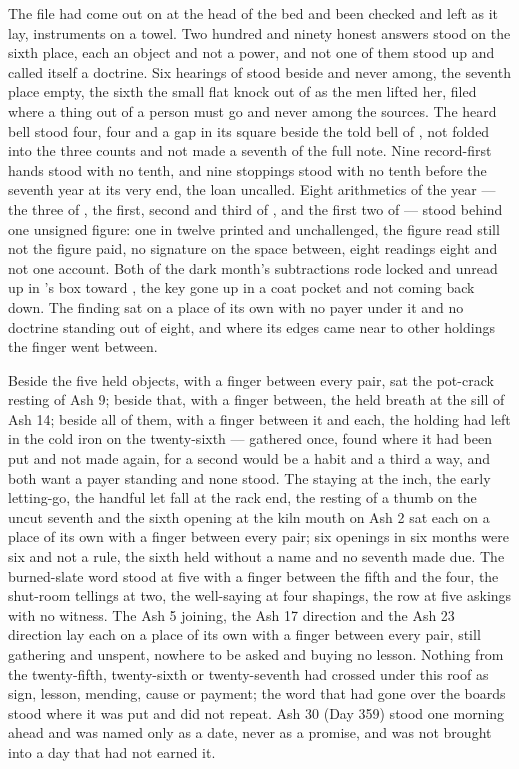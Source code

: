 The file had come out on  at the head of the bed and been checked and left as it lay, instruments on a towel. Two hundred and ninety honest answers stood on the sixth place, each an object and not a power, and not one of them stood up and called itself a doctrine. Six hearings of  stood beside and never among, the seventh place empty, the sixth the small flat knock out of  as the men lifted her, filed where a thing out of a person must go and never among the sources. The heard bell stood four, four and a gap in its square beside the told bell of , not folded into the three counts and not made a seventh of the full note. Nine record-first hands stood with no tenth, and nine stoppings stood with no tenth before the seventh year at its very end, the loan uncalled. Eight arithmetics of the year --- the three of , the first, second and third of , and the first two of  --- stood behind one unsigned figure: one in twelve printed and unchallenged, the figure read still not the figure paid, no signature on the space between, eight readings eight and not one account. Both of the dark month's subtractions rode locked and unread up  in 's box toward , the key gone up in a coat pocket and not coming back down. The finding sat on a place of its own with no payer under it and no doctrine standing out of eight, and where its edges came near to other holdings the finger went between.

Beside the five held objects, with a finger between every pair, sat the pot-crack resting of Ash 9; beside that, with a finger between, the held breath at the sill of Ash 14; beside all of them, with a finger between it and each, the holding  had left in the cold iron on the twenty-sixth --- gathered once, found where it had been put and not made again, for a second would be a habit and a third a way, and both want a payer standing and none stood. The staying at the inch, the early letting-go, the handful let fall at the rack end, the resting of a thumb on the uncut seventh and the sixth opening at the kiln mouth on Ash 2 sat each on a place of its own with a finger between every pair; six openings in six months were six and not a rule, the sixth held without a name and no seventh made due. The burned-slate word stood at five with a finger between the fifth and the four, the shut-room tellings at two, the well-saying at four shapings, the row at five askings with no witness. The Ash 5 joining, the Ash 17 direction and the Ash 23 direction lay each on a place of its own with a finger between every pair, still gathering and unspent, nowhere to be asked and buying no lesson. Nothing from the twenty-fifth, twenty-sixth or twenty-seventh had crossed under this roof as sign, lesson, mending, cause or payment; the word that had gone over the boards stood where it was put and did not repeat. Ash 30 (Day 359) stood one morning ahead and was named only as a date, never as a promise, and was not brought into a day that had not earned it.

